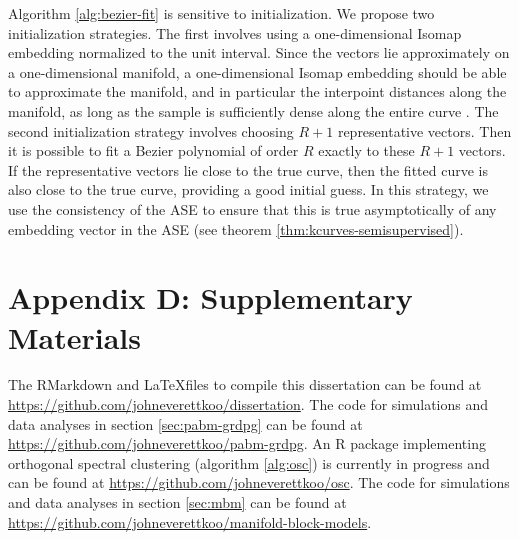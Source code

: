 \documentclass[
  12pt,
]{article}
\theoremstyle{definition}
\theoremstyle{definition}
\theoremstyle{definition}
\theoremstyle{definition}
\theoremstyle{remark}
\begin{document}
Algorithm \ref{alg:bezier-fit} is sensitive to initialization.
We propose two initialization strategies.
The first involves using a one-dimensional Isomap \citep{Tenenbaum2000-ff} embedding normalized to the unit interval.
Since the vectors lie approximately on a one-dimensional manifold, a one-dimensional Isomap embedding should be able to approximate the manifold, and in particular the interpoint distances along the manifold, as long as the sample is sufficiently dense along the entire curve \citep{trosset2020rehabilitating}.
The second initialization strategy involves choosing \(R+1\) representative vectors.
Then it is possible to fit a Bezier polynomial of order \(R\) exactly to these \(R+1\) vectors.
If the representative vectors lie close to the true curve, then the fitted curve is also close to the true curve, providing a good initial guess.
In this strategy, we use the consistency of the ASE \citep{rubindelanchy2017statistical} to ensure that this is true asymptotically of any embedding vector in the ASE (see theorem \ref{thm:kcurves-semisupervised}).

\newpage

\section{Appendix D: Supplementary Materials}

The RMarkdown and \LaTeX files to compile this dissertation can be found at \url{https://github.com/johneverettkoo/dissertation}.
The code for simulations and data analyses in section \ref{sec:pabm-grdpg} can be found at \url{https://github.com/johneverettkoo/pabm-grdpg}.
An R package implementing orthogonal spectral clustering (algorithm \ref{alg:osc}) is currently in progress and can be found at \url{https://github.com/johneverettkoo/osc}.
The code for simulations and data analyses in section \ref{sec:mbm} can be found at \url{https://github.com/johneverettkoo/manifold-block-models}.

\newpage

\renewcommand\refname{References}
  
\end{document}
